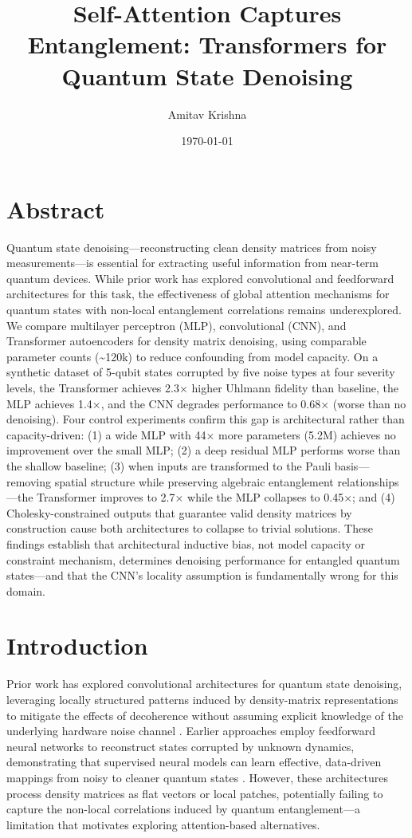 \documentclass[11pt]{article}
\author{Amitav Krishna}
\date{\today}
\title{Self-Attention Captures Entanglement: Transformers for Quantum State Denoising}
\begin{document}
\maketitle
\section{Abstract}
\label{sec:org115c944}

Quantum state denoising—reconstructing clean density matrices from noisy measurements—is essential for extracting useful information from near-term quantum devices. While prior work has explored convolutional and feedforward architectures for this task, the effectiveness of global attention mechanisms for quantum states with non-local entanglement correlations remains underexplored. We compare multilayer perceptron (MLP), convolutional (CNN), and Transformer autoencoders for density matrix denoising, using comparable parameter counts (\textasciitilde{}120k) to reduce confounding from model capacity. On a synthetic dataset of 5-qubit states corrupted by five noise types at four severity levels, the Transformer achieves 2.3× higher Uhlmann fidelity than baseline, the MLP achieves 1.4×, and the CNN degrades performance to 0.68× (worse than no denoising). Four control experiments confirm this gap is architectural rather than capacity-driven: (1) a wide MLP with 44× more parameters (5.2M) achieves no improvement over the small MLP; (2) a deep residual MLP performs worse than the shallow baseline; (3) when inputs are transformed to the Pauli basis—removing spatial structure while preserving algebraic entanglement relationships—the Transformer improves to 2.7× while the MLP collapses to 0.45×; and (4) Cholesky-constrained outputs that guarantee valid density matrices by construction cause both architectures to collapse to trivial solutions. These findings establish that architectural inductive bias, not model capacity or constraint mechanism, determines denoising performance for entangled quantum states—and that the CNN's locality assumption is fundamentally wrong for this domain.
\section{Introduction}
\label{sec:org5550992}
Prior work has explored convolutional architectures for quantum state denoising, leveraging locally structured patterns induced by density-matrix representations to mitigate the effects of decoherence without assuming explicit knowledge of the underlying hardware noise channel \citep{kendre2025machinelearningquantumnoise}. Earlier approaches employ feedforward neural networks to reconstruct states corrupted by unknown dynamics, demonstrating that supervised neural models can learn effective, data-driven mappings from noisy to cleaner quantum states \citep{Morgillo_2024}. However, these architectures process density matrices as flat vectors or local patches, potentially failing to capture the non-local correlations induced by quantum entanglement—a limitation that motivates exploring attention-based alternatives.
\end{document}
